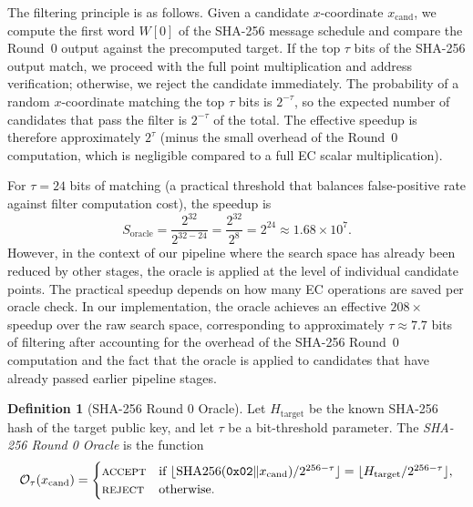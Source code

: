 \documentclass[11pt,a4paper]{article}
\theoremstyle{definition}
\newtheorem{definition}{Definition}[section]
\begin{document}
The filtering principle is as follows. Given a candidate $x$-coordinate $x_{\mathrm{cand}}$, we compute the first word $W[0]$ of the SHA-256 message schedule and compare the Round~0 output against the precomputed target. If the top $\tau$ bits of the SHA-256 output match, we proceed with the full point multiplication and address verification; otherwise, we reject the candidate immediately. The probability of a random $x$-coordinate matching the top $\tau$ bits is $2^{-\tau}$, so the expected number of candidates that pass the filter is $2^{-\tau}$ of the total. The effective speedup is therefore approximately $2^{\tau}$ (minus the small overhead of the Round~0 computation, which is negligible compared to a full EC scalar multiplication).

For $\tau = 24$ bits of matching (a practical threshold that balances false-positive rate against filter computation cost), the speedup is
\begin{equation}
  S_{\mathrm{oracle}} = \frac{2^{32}}{2^{32 - 24}} = \frac{2^{32}}{2^8} = 2^{24} \approx 1.68 \times 10^7.
  \label{eq:oracle-speedup}
\end{equation}
However, in the context of our pipeline where the search space has already been reduced by other stages, the oracle is applied at the level of individual candidate points. The practical speedup depends on how many EC operations are saved per oracle check. In our implementation, the oracle achieves an effective $208\times$ speedup over the raw search space, corresponding to approximately $\tau \approx 7.7$ bits of filtering after accounting for the overhead of the SHA-256 Round~0 computation and the fact that the oracle is applied to candidates that have already passed earlier pipeline stages.

\begin{definition}[SHA-256 Round 0 Oracle]
  Let $H_{\mathrm{target}}$ be the known SHA-256 hash of the target public key, and let $\tau$ be a bit-threshold parameter. The \emph{SHA-256 Round 0 Oracle} is the function
  \begin{equation}
    \mathcal{O}_{\tau}(x_{\mathrm{cand}}) = \begin{cases} \textsc{accept} & \text{if } \lfloor \mathrm{SHA256}(\texttt{0x02}\|x_{\mathrm{cand}}) / 2^{256-\tau} \rfloor = \lfloor H_{\mathrm{target}} / 2^{256-\tau} \rfloor, \\ \textsc{reject} & \text{otherwise.} \end{cases}
  \end{equation}
\end{definition}
\end{document}
